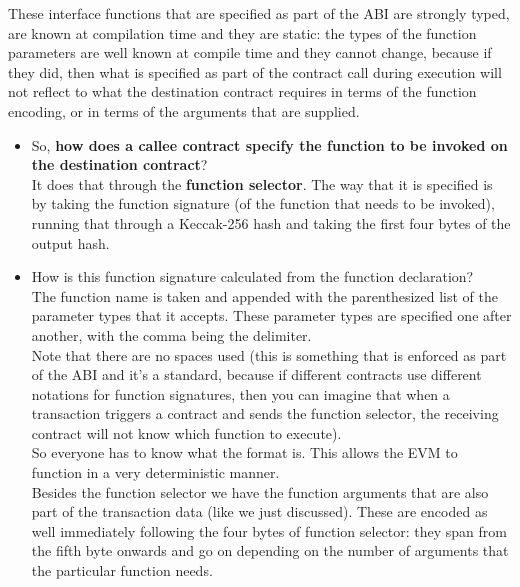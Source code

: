 These interface functions that are specified as part of the ABI are
strongly typed, are known at compilation time and they are static: the
types of the function parameters are well known at compile time and they
cannot change, because if they did, then what is specified as part of
the contract call during execution will not reflect to what the
destination contract requires in terms of the function encoding, or in
terms of the arguments that are supplied.

\begin{itemize}
\item
  So, \textbf{how does a callee contract specify the function to be
  invoked on the destination contract}?\\

  It does that through the \textbf{function selector}. The way that it
  is specified is by taking the function signature (of the function that
  needs to be invoked), running that through a Keccak-256 hash and
  taking the first four bytes of the output hash.
\item
  How is this function signature calculated from the function
  declaration?\\

  The function name is taken and appended with the parenthesized list of
  the parameter types that it accepts. These parameter types are
  specified one after another, with the comma being the delimiter.\\

  Note that there are no spaces used (this is something that is enforced
  as part of the ABI and it's a standard, because if different contracts
  use different notations for function signatures, then you can imagine
  that when a transaction triggers a contract and sends the function
  selector, the receiving contract will not know which function to
  execute).\\

  So everyone has to know what the format is. This allows the EVM to
  function in a very deterministic manner.\\

  Besides the function selector we have the function arguments that are
  also part of the transaction data (like we just discussed). These are
  encoded as well immediately following the four bytes of function
  selector: they span from the fifth byte onwards and go on depending on
  the number of arguments that the particular function needs.
\end{itemize}

